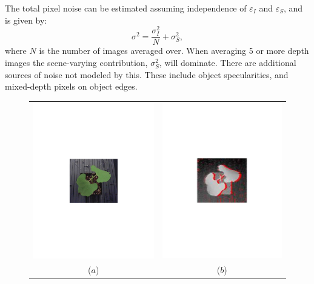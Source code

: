 The total pixel noise can be estimated assuming independence of $\varepsilon_I$ and $\varepsilon_S$, and is given by:
\begin{equation}
\sigma^2 = \frac{\sigma_I^2}{N} + \sigma_S^2,\label{eq:sigma}
\end{equation}
where $N$ is the number of images averaged over.  When averaging 5 or more depth images the scene-varying contribution, $\sigma_S^2$, will dominate.  There are additional sources of noise not modeled by this.  These include object specularities, and mixed-depth pixels on object edges.  


\begin{figure}
\begin{center}
\begin{tabular}{cc}
\includegraphics[trim=190 280 190 290,clip,width=0.47\linewidth]{Figures/beanColor} &
\includegraphics[trim=190 280 190 290,clip,width=0.47\linewidth]{Figures/beanDepth} \\
($a$) & ($b$) \\

\end{tabular}
\end{center}
\end{figure}
